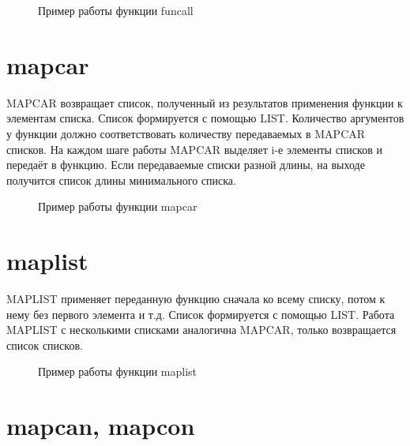 \begin{figure}[H]
    \begin{listingbox}{}
        
    \end{listingbox}
    \caption{Пример работы функции funcall}
    \label{lst:funcall-example}
\end{figure}

\section{mapcar}

MAPCAR возвращает список, полученный из результатов применения
функции к элементам списка. Список формируется с помощью LIST.
Количество аргументов у функции должно соответствовать количеству 
передаваемых в MAPCAR списков. На каждом шаге работы MAPCAR выделяет
i-е элементы списков и передаёт в функцию. Если передаваемые 
списки разной длины, на выходе получится список длины минимального 
списка. 

\begin{figure}[H]
    \begin{listingbox}{}
        
    \end{listingbox}
    \caption{Пример работы функции mapcar}
    \label{lst:mapcar-example}
\end{figure}

\section{maplist}

MAPLIST применяет переданную функцию сначала ко всему списку,
потом к нему без первого элемента и т.д. Список формируется с помощью 
LIST. Работа MAPLIST с несколькими списками аналогична MAPCAR, только
возвращается список списков.

\begin{figure}[H]
    \begin{listingbox}{}
        
    \end{listingbox}
    \caption{Пример работы функции maplist}
    \label{lst:maplist-example}
\end{figure}

\section{mapcan, mapcon}

